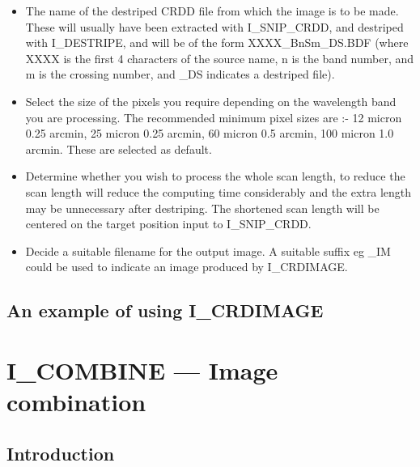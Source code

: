 \documentclass[nolof,noabs,11pt]{starlink}
\begin{document}
\begin{itemize}

\item The name of the destriped CRDD file from which the image is to be made.
These will usually have been extracted with I\_SNIP\_CRDD, and destriped with
I\_DESTRIPE, and will be of the form XXXX\_BnSm\_DS.BDF (where XXXX
is the first 4 characters of the source name, n is the band number, and m is
the crossing number, and \_DS indicates a destriped file).

\item Select the size of the pixels you require depending
on the wavelength band you are processing. The recommended minimum pixel sizes
are :- 12 micron  0.25 arcmin, 25 micron  0.25 arcmin, 60 micron   0.5 arcmin,
100 micron  1.0 arcmin. These are selected as default.

\item Determine whether you wish to process the whole scan length, to reduce
the scan length will reduce the computing time considerably and the extra
length may be unnecessary after destriping. The shortened scan length will be
centered on the target position input to I\_SNIP\_CRDD.

\item Decide a suitable filename for the output image. A suitable suffix eg \_IM
could be used to indicate an image produced by I\_CRDIMAGE.
\end {itemize}

\subsection{An example of using I\_CRDIMAGE}

\pagebreak

\section {I\_COMBINE --- Image combination}

\subsection {Introduction}
\end{document}
